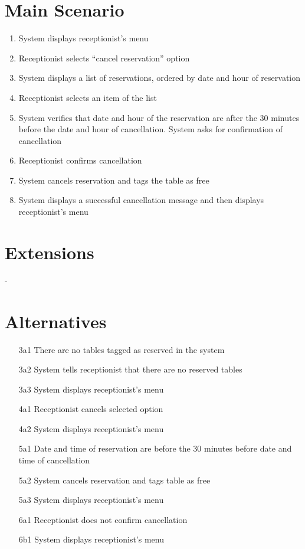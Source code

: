 \documentclass[a4paper,11pt,oneside]{book}
\newcommand{\tinytodo}[2][]{\todo[caption={#2}, size=\footnotesize, #1]{\renewcommand{\baselinestretch}{0.5}\selectfont#2\par}}
\newcommand{\cancel}[1]{#1 cancels selected option}
\newcommand{\menu}[1]{System displays #1's menu}
\begin{document}
\section{Main Scenario}

\begin{enumerate}
\item \menu{receptionist}\tinytodo{pre?}
\item Receptionist selects ``cancel reservation'' option
\item System displays a list of reservations, ordered by date and hour of reservation
\item Receptionist selects an item of the list
\item System verifies that date and hour of the reservation are after the 30 minutes before the date and hour of cancellation. System asks for confirmation of cancellation
\item Receptionist confirms cancellation
\item System cancels reservation and tags the table as free
\item System displays a successful cancellation message and \tinytodo{split?} then displays receptionist's menu
\end{enumerate}

\section{Extensions}

-

\section{Alternatives}

\begin{enumerate}
  \item [3a1] There are no tables tagged as reserved in the system
  \item [3a2] System tells receptionist that there are no reserved tables
  \item [3a3] \menu{receptionist}
    \\
  \item [4a1] \cancel{Receptionist}
  \item [4a2] \menu{receptionist}
    \\
  \item [5a1] Date and time of reservation are before the 30 minutes before date and time of cancellation
  \item [5a2] System cancels reservation and tags table as free
  \item [5a3] \menu{receptionist}
    \\
  \item [6a1] Receptionist does not confirm cancellation
  \item [6b1] \menu{receptionist}
\end{enumerate}
\end{document}
